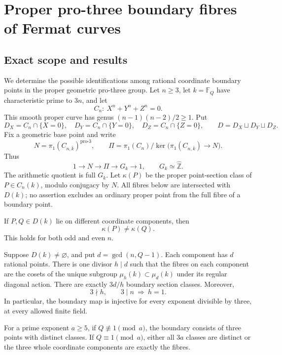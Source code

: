 \section{Proper pro-three boundary fibres of Fermat curves}
\label{sec:finitefield3-boundary-reconstruction}

\subsection{Exact scope and results}
\label{subsec:ff3-scope}

We determine the possible identifications among rational coordinate
boundary points in the proper geometric pro-three group.
Let \(n\ge3\), let \(k=\mathbb F_Q\) have characteristic prime to \(3n\),
and let
\[
 C_n:\ X^n+Y^n+Z^n=0.
\]
This smooth proper curve has genus \((n-1)(n-2)/2\ge1\). Put
\[
 D_X=C_n\cap\{X=0\},\quad D_Y=C_n\cap\{Y=0\},\quad
 D_Z=C_n\cap\{Z=0\},\qquad D=D_X\sqcup D_Y\sqcup D_Z.
\]
Fix a geometric base point and write
\[
 N=\pi_1(C_{n,\bar k})^{\mathrm{pro}\text{-}3},\qquad
 \Pi=\pi_1(C_n)/\ker\bigl(\pi_1(C_{n,\bar k})\longrightarrow N\bigr).
\]
Thus
\begin{equation}
 1\longrightarrow N\longrightarrow\Pi\longrightarrow G_k
 \longrightarrow1,\qquad G_k\simeq\widehat{\mathbb Z}.
 \label{eq:ff3-1-1}
\end{equation}
The arithmetic quotient is full \(G_k\). Let \(\kappa(P)\) be the
proper point-section class of \(P\in C_n(k)\), modulo conjugacy by \(N\).
All fibres below are intersected with \(D(k)\); no assertion excludes
an ordinary proper point from the full fibre of a boundary point.

\begin{theorem}
\label{thm:ff3-different-components}
If \(P,Q\in D(k)\) lie on different coordinate components, then
\begin{equation}
 \kappa(P)\ne\kappa(Q).
 \label{eq:ff3-1-2}
\end{equation}
This holds for both odd and even \(n\).
\end{theorem}

\begin{theorem}
\label{thm:ff3-dichotomy}
Suppose \(D(k)\ne\varnothing\), and put \(d=\gcd(n,Q-1)\).
Each component has \(d\) rational points. There is one divisor \(h\mid d\)
such that the fibres on each component are the cosets of the unique
subgroup \(\mu_h(k)\subset\mu_d(k)\) under its regular diagonal action.
There are exactly \(3d/h\) boundary section classes.
Moreover,
\[
 3\nmid h,\qquad 3\mid n\ \Longrightarrow\ h=1.
\]
In particular, the boundary map is injective for every exponent
divisible by three, at every allowed finite field.

For a prime exponent \(a\ge5\), if \(Q\not\equiv1\pmod a\), the
boundary consists of three points with distinct classes. If
\(Q\equiv1\pmod a\), either all \(3a\) classes are distinct or the
three whole coordinate components are exactly the fibres.
\end{theorem}

